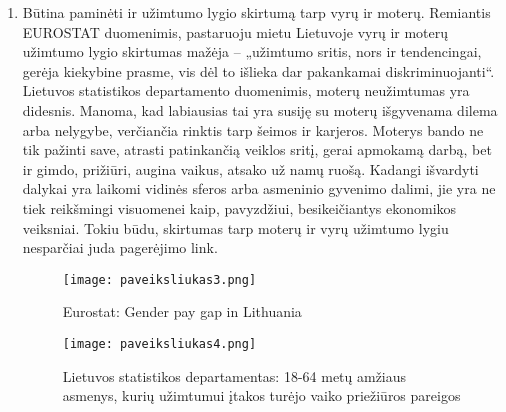 \documentclass[titlepage, 11pt]{article}
\begin{document}
\begin{enumerate}
\item Būtina paminėti ir užimtumo lygio skirtumą tarp vyrų ir moterų. Remiantis EUROSTAT duomenimis, pastaruoju mietu Lietuvoje vyrų ir moterų užimtumo  lygio skirtumas mažėja – „užimtumo sritis, nors ir tendencingai, gerėja kiekybine prasme, vis dėl to išlieka dar pakankamai diskriminuojanti“. Lietuvos statistikos departamento duomenimis, moterų neužimtumas yra didesnis. Manoma, kad labiausias tai yra susiję su moterų išgyvenama dilema arba nelygybe, verčiančia rinktis tarp šeimos ir karjeros. Moterys bando ne tik pažinti save, atrasti patinkančią veiklos sritį, gerai apmokamą darbą, bet ir gimdo, prižiūri, augina vaikus, atsako už namų ruošą. Kadangi išvardyti dalykai yra laikomi vidinės sferos arba asmeninio gyvenimo dalimi, jie yra ne tiek reikšmingi visuomenei kaip, pavyzdžiui, besikeičiantys ekonomikos veiksniai. Tokiu būdu, skirtumas tarp moterų ir vyrų užimtumo lygiu nesparčiai juda pagerėjimo link.

\begin{figure}[H]
\captionsetup{justification=centering}
\center
\texttt{[image: paveiksliukas3.png]}
\caption{Eurostat: Gender pay gap in Lithuania}
\end{figure}

\begin{figure}[H]
\captionsetup{justification=centering}
\center
\texttt{[image: paveiksliukas4.png]}
\caption{Lietuvos statistikos departamentas: 18-64 metų amžiaus asmenys, kurių užimtumui įtakos turėjo vaiko priežiūros pareigos}
\end{figure}

\end{enumerate}
\end{document}
